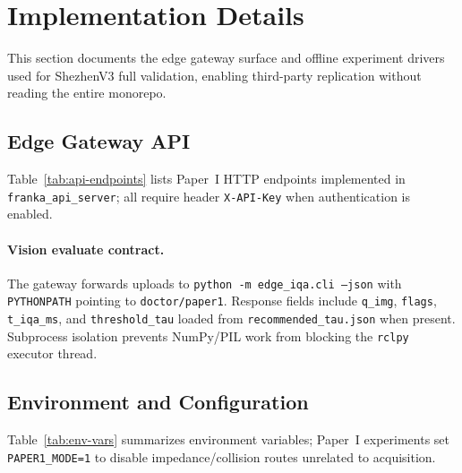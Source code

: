 \section{Implementation Details}
\label{sec:implementation}

This section documents the edge gateway surface and offline experiment drivers used for ShezhenV3 full validation, enabling third-party replication without reading the entire monorepo.

\subsection{Edge Gateway API}
Table~\ref{tab:api-endpoints} lists Paper~I HTTP endpoints implemented in \texttt{franka\_api\_server}; all require header \texttt{X-API-Key} when authentication is enabled.

\begin{table}[t]
\centering
\caption{Edge gateway endpoints (Paper~I).}
\label{tab:api-endpoints}
\small
{}
\end{table}

\paragraph{Vision evaluate contract.}
The gateway forwards uploads to \texttt{python -m edge\_iqa.cli --json} with \texttt{PYTHONPATH} pointing to \texttt{doctor/paper1}.
Response fields include \texttt{q\_img}, \texttt{flags}, \texttt{t\_iqa\_ms}, and \texttt{threshold\_tau} loaded from \texttt{recommended\_tau.json} when present.
Subprocess isolation prevents NumPy/PIL work from blocking the \texttt{rclpy} executor thread.

\subsection{Environment and Configuration}
Table~\ref{tab:env-vars} summarizes environment variables; Paper~I experiments set \texttt{PAPER1\_MODE=1} to disable impedance/collision routes unrelated to acquisition.

